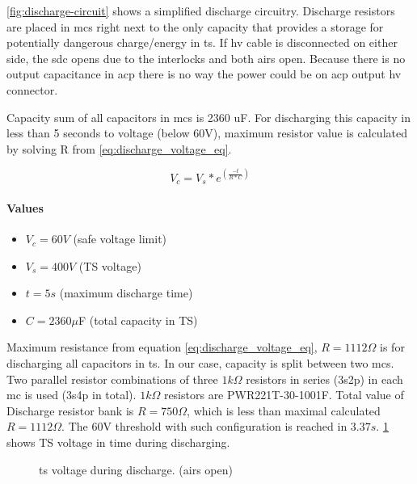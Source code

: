 \ref{fig:discharge-circuit} shows a simplified discharge circuitry. Discharge resistors are placed in \glspl{mc} right next to the only capacity that provides a storage for potentially dangerous charge/energy in \gls{ts}. If \gls{hv} cable is disconnected on either side, the \gls{sdc} opens due to the interlocks and both \glspl{air} open. Because there is no output capacitance in \gls{acp} there is no way the power could be on \gls{acp} output \gls{hv} connector.

Capacity sum of all capacitors in \glspl{mc} is 2360 uF. For discharging this capacity in less than 5 seconds to voltage (below 60V), maximum resistor value is calculated by solving R from \ref{eq:discharge_voltage_eq}.

\begin{equation}
	V_{c}=V_{s}*e^{(\frac{-t}{R*C})}
	\label{eq:discharge_voltage_eq}
\end{equation}

\paragraph{Values}
\begin{itemize}
	\item $V_c = 60 V$ (safe voltage limit)
	\item $V_s = 400 V$ (TS voltage)
	\item $t = 5 s$ (maximum discharge time)
	\item $C = 2360\mu$F (total capacity in TS)
\end{itemize}

Maximum resistance from equation \ref{eq:discharge_voltage_eq}, $R = 1112\Omega$ is for discharging all capacitors in \gls{ts}. In our case, capacity is split between two \glspl{mc}. Two parallel resistor combinations of three $1k\Omega$ resistors in series (3s2p) in each \gls{mc} is used (3s4p in total). $1k\Omega$ resistors are PWR221T-30-1001F. Total value of Discharge resistor bank is $R = 750\Omega$, which is less than maximal calculated $R = 1112\Omega$. The 60V threshold with such configuration is reached in $3.37s$. \ref{fig:discharge_voltage_time} shows TS voltage in time during discharging.

\begin{figure}
	\caption{\gls{ts} voltage during discharge. (\glspl{air} open)}
	\label{fig:discharge_voltage_time}
\end{figure}


